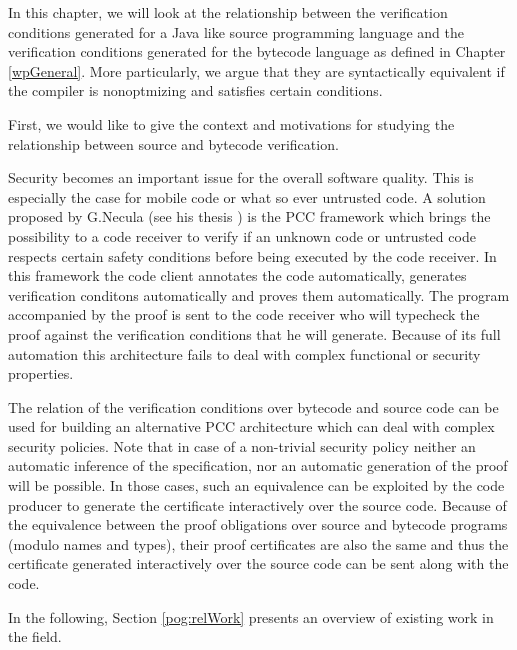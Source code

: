 

In this chapter, we will look at the relationship between
the verification conditions generated for a Java like source programming 
language and the verification conditions generated for the bytecode language 
as defined in Chapter \ref{wpGeneral}. More particularly, we 
argue that they are syntactically equivalent if the compiler is nonoptmizing and satisfies certain 
conditions.
  

First, we would like to give the 
context and motivations for studying the relationship 
between source and bytecode verification.


 Security becomes an important issue for the overall software quality.
This is especially the case for mobile code or what so ever untrusted code. 
A solution  proposed by G.Necula (see his thesis \cite{ComNec}) 
is the PCC framework which brings the possibility to a  code receiver to 
verify if an unknown code  or untrusted code respects certain safety conditions before being executed by the code receiver.
In this framework the code client annotates the code automatically, generates verification conditons automatically
 and proves them automatically.
The  program accompanied by the proof  is sent to the code receiver  who will typecheck the proof against 
the verification conditions that he will generate.
Because of its full automation this architecture fails to deal with complex functional or security properties.


The relation of the verification conditions over bytecode and source code can be used for building an
 alternative PCC architecture which can deal with complex security policies. Note that in case of a non-trivial 
security policy neither an automatic inference of the specification, nor an automatic generation 
of the proof will be possible.
In those cases, such an equivalence can be exploited by the code producer to generate
 the certificate interactively over the source code. Because of the
equivalence between the proof obligations over source and bytecode programs (modulo names and types), 
their  proof certificates are also the same and thus the certificate generated interactively over the
 source code can be sent along with the code.   




In the following, Section \ref{pog:relWork} presents an overview of existing work in the field.

